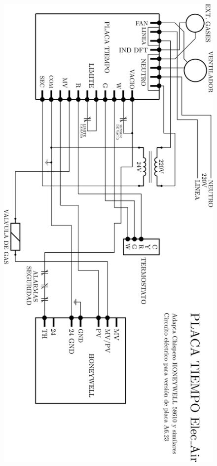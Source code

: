 \documentclass{article}
\begin{document}
\begin{figure}[H]
\centering
\includegraphics[width=0.65\linewidth]{images/PlacaTiempo_PlanoV623.png}
\end{figure}

\newpage
\end{document}
